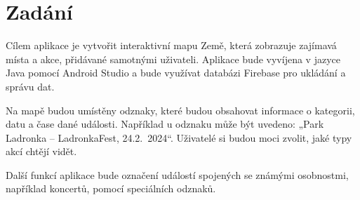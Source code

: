 \chapter*{Zadání}

Cílem aplikace je vytvořit interaktivní mapu Země, která zobrazuje zajímavá místa a akce, přidávané samotnými uživateli. Aplikace bude vyvíjena v jazyce Java pomocí Android Studio a bude využívat databázi Firebase pro ukládání a správu dat. 

Na mapě budou umístěny odznaky, které budou obsahovat informace o kategorii, datu a čase dané události. Například u odznaku může být uvedeno: „Park Ladronka – LadronkaFest, 24.2.~2024“. Uživatelé si budou moci zvolit, jaké typy akcí chtějí vidět.

Další funkcí aplikace bude označení událostí spojených se známými osobnostmi, například koncertů, pomocí speciálních odznaků. 